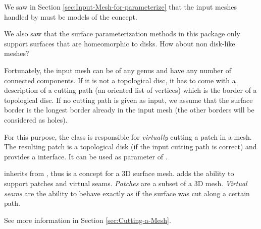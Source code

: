 We saw in Section \ref{sec:Input-Mesh-for-parameterize}
that the input meshes handled by 
must be models of the  concept.

We also saw that the surface parameterization methods in this package only support
surfaces that are homeomorphic to disks. How about non disk-like meshes?

Fortunately, the input mesh can be of any genus and
have any number of connected components. If it is not a topological
disc, it has to come with a description of a cutting path (an oriented list of
vertices) which is the border of a topological disc.  If no cutting path is
given as input, we assume that the surface border is the longest border already
in the input mesh (the other borders will be considered as holes).

For this purpose, the
class is responsible for \emph{virtually} cutting
a patch in a  mesh.
The resulting patch is a topological
disk (if the input cutting path is correct)
and provides a  interface. It can be used as
parameter of .

 inherits from ,
thus is a concept for a 3D surface mesh.
 adds the ability to support patches and
virtual seams. \emph{Patches} are a subset of a 3D mesh.
\emph{Virtual seams} are the ability
to behave exactly as if the surface was cut along a certain path.

See more information in Section \ref{sec:Cutting-a-Mesh}.
